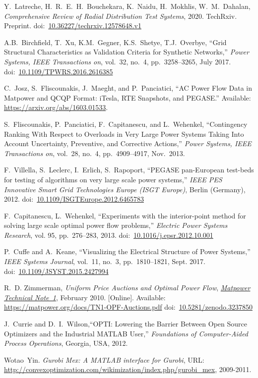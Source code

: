 \documentclass[12pt]{article}
\newcommand{\matpower}[0]{{\sc Matpower}}
\newcommand{\TNoneurl}[0]{https://matpower.org/docs/TN1-OPF-Auctions.pdf}
\newcommand{\TNone}[0]{\href{\TNoneurl}{\it \matpower{} Technical Note~1}}
\newcommand{\doi}[1]{doi:~\href{https://doi.org/#1}{#1}}
\numberwithin{equation}{section}
\numberwithin{table}{section}
\numberwithin{figure}{section}
\begin{document}
\begin{thebibliography}{99}
Y.~Latreche, H.~R.~E.~H.~Bouchekara, K.~Naidu, H.~Mokhlis, W.~M.~Dahalan, \emph{Comprehensive Review of Radial Distribution Test Systems}, 2020. TechRxiv. Preprint. \doi{10.36227/techrxiv.12578648.v1}

A.B.~Birchfield, T.~Xu, K.M.~Gegner, K.S.~Shetye, T.J.~Overbye,
``Grid Structural Characteristics as Validation Criteria for Synthetic Networks,''  \emph{Power Systems, IEEE Transactions on}, vol.~32, no.~4, pp.~3258--3265, July 2017.
\doi{10.1109/TPWRS.2016.2616385}

C.~Josz, S.~Fliscounakis, J.~Maeght, and P.~Panciatici, ``AC Power
Flow Data in \matpower{} and QCQP Format: iTesla, RTE Snapshots, and PEGASE.''
Available: \url{https://arxiv.org/abs/1603.01533}.

S.~Fliscounakis, P.~Panciatici, F.~Capitanescu, and L.~Wehenkel, ``Contingency Ranking With Respect to Overloads in Very Large Power Systems Taking Into Account Uncertainty, Preventive, and Corrective Actions,'' \emph{Power Systems, IEEE Transactions on}, vol.~28, no.~4, pp.~4909--4917, Nov.~2013.

F.~Villella, S.~Leclerc, I.~Erlich, S.~Rapoport, ``PEGASE pan-European test-beds for testing of algorithms on very large scale power systems,'' \emph{IEEE PES Innovative Smart Grid Technologies Europe (ISGT Europe)}, Berlin (Germany), 2012.
\doi{10.1109/ISGTEurope.2012.6465783}

F.~Capitanescu, L.~Wehenkel, ``Experiments with the interior-point method for solving large scale optimal power flow problems,'' \emph{Electric Power Systems Research}, vol. 95, pp.~276--283, 2013.
\doi{10.1016/j.epsr.2012.10.001}

P.~Cuffe and A.~Keane, ``Visualizing the Electrical Structure of Power Systems,'' \emph{IEEE Systems Journal}, vol.~11, no.~3, pp.~1810--1821, Sept. 2017.
\doi{10.1109/JSYST.2015.2427994}

R.~D. Zimmerman, \emph{Uniform Price Auctions and Optimal Power Flow}, \TNone, February 2010. [Online]. Available: \url{\TNoneurl}
\doi{10.5281/zenodo.3237850}

J.~Currie and D.~I.~Wilson,``OPTI: Lowering the Barrier Between Open Source Optimizers and the Industrial MATLAB User,'' \emph{Foundations of Computer-Aided Process Operations}, Georgia, USA, 2012.

Wotao~Yin. \emph{Gurobi Mex: A MATLAB interface for Gurobi}, URL: \url{http://convexoptimization.com/wikimization/index.php/gurobi_mex}, 2009-2011.


\end{thebibliography}
\end{document}
